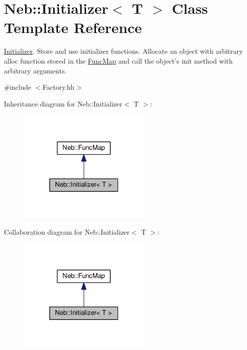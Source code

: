 \hypertarget{classNeb_1_1Initializer}{\section{Neb\-:\-:Initializer$<$ T $>$ Class Template Reference}
\label{classNeb_1_1Initializer}
}


\hyperlink{classNeb_1_1Initializer}{Initializer}. Store and use initializer functions. Allocate an object with arbitrary alloc function stored in the \hyperlink{classNeb_1_1FuncMap}{Func\-Map} and call the object's {\ttfamily init} method with arbitrary arguments.  




{\ttfamily \#include $<$Factory.\-hh$>$}



Inheritance diagram for Neb\-:\-:Initializer$<$ T $>$\-:
\nopagebreak
\begin{figure}[H]
\begin{center}
\leavevmode
\includegraphics[width=184pt]{classNeb_1_1Initializer__inherit__graph}
\end{center}
\end{figure}


Collaboration diagram for Neb\-:\-:Initializer$<$ T $>$\-:
\nopagebreak
\begin{figure}[H]
\begin{center}
\leavevmode
\includegraphics[width=184pt]{classNeb_1_1Initializer__coll__graph}
\end{center}
\end{figure}
